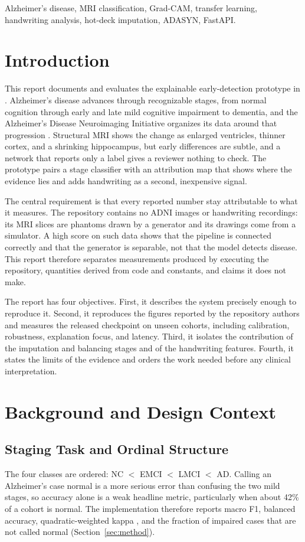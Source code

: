 \documentclass[conference]{IEEEtran}
\begin{document}
\begin{IEEEkeywords}
Alzheimer's disease, MRI classification, Grad-CAM, transfer learning, handwriting analysis, hot-deck imputation, ADASYN, FastAPI.
\end{IEEEkeywords}

\section{Introduction}
This report documents and evaluates the explainable early-detection prototype in \cite{repo}. Alzheimer's disease advances through recognizable stages, from normal cognition through early and late mild cognitive impairment to dementia, and the Alzheimer's Disease Neuroimaging Initiative organizes its data around that progression \cite{adni}. Structural MRI shows the change as enlarged ventricles, thinner cortex, and a shrinking hippocampus, but early differences are subtle, and a network that reports only a label gives a reviewer nothing to check. The prototype pairs a stage classifier with an attribution map that shows where the evidence lies and adds handwriting as a second, inexpensive signal.

The central requirement is that every reported number stay attributable to what it measures. The repository contains no ADNI images or handwriting recordings: its MRI slices are phantoms drawn by a generator and its drawings come from a simulator. A high score on such data shows that the pipeline is connected correctly and that the generator is separable, not that the model detects disease. This report therefore separates measurements produced by executing the repository, quantities derived from code and constants, and claims it does not make.

The report has four objectives. First, it describes the system precisely enough to reproduce it. Second, it reproduces the figures reported by the repository authors and measures the released checkpoint on unseen cohorts, including calibration, robustness, explanation focus, and latency. Third, it isolates the contribution of the imputation and balancing stages and of the handwriting features. Fourth, it states the limits of the evidence and orders the work needed before any clinical interpretation.

\section{Background and Design Context}
\subsection{Staging Task and Ordinal Structure}
The four classes are ordered: NC $<$ EMCI $<$ LMCI $<$ AD. Calling an Alzheimer's case normal is a more serious error than confusing the two mild stages, so accuracy alone is a weak headline metric, particularly when about 42\% of a cohort is normal. The implementation therefore reports macro F1, balanced accuracy, quadratic-weighted kappa \cite{kappa}, and the fraction of impaired cases that are not called normal (Section~\ref{sec:method}).
\end{document}
